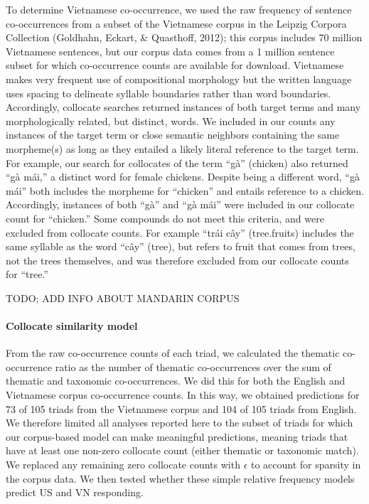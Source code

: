 \documentclass[10pt, letterpaper]{article}
\begin{document}
To determine Vietnamese co-occurrence, we used the raw frequency of
sentence co-occurrences from a subset of the Vietnamese corpus in the
Leipzig Corpora Collection (Goldhahn, Eckart, \& Quasthoff, 2012); this
corpus includes 70 million Vietnamese sentences, but our corpus data
comes from a 1 million sentence subset for which co-occurrence counts
are available for download. Vietnamese makes very frequent use of
compositional morphology but the written language uses spacing to
delineate syllable boundaries rather than word boundaries. Accordingly,
collocate searches returned instances of both target terms and many
morphologically related, but distinct, words. We included in our counts
any instances of the target term or close semantic neighbors containing
the same morpheme(s) as long as they entailed a likely literal reference
to the target term. For example, our search for collocates of the term
``gà'' (chicken) also returned ``gà mái,'' a distinct word for female
chickens. Despite being a different word, ``gà mái'' both includes the
morpheme for ``chicken'' and entails reference to a chicken.
Accordingly, instances of both ``gà'' and ``gà mái'' were included in
our collocate count for ``chicken.'' Some compounds do not meet this
criteria, and were excluded from collocate counts. For example ``trái
cây'' (tree.fruits) includes the same syllable as the word ``cây''
(tree), but refers to fruit that comes from trees, not the trees
themselves, and was therefore excluded from our collocate counts for
``tree.''

TODO; ADD INFO ABOUT MANDARIN CORPUS

\hypertarget{collocate-similarity-model}{%
\paragraph{Collocate similarity
model}\label{collocate-similarity-model}}

From the raw co-occurrence counts of each triad, we calculated the
thematic co-occurrence ratio as the number of thematic co-occurrences
over the sum of thematic and taxonomic co-occurrences. We did this for
both the English and Vietnamese corpus co-occurrence counts. In this
way, we obtained predictions for 73 of 105 triads from the Vietnamese
corpus and 104 of 105 triads from English. We therefore limited all
analyses reported here to the subset of triads for which our
corpus-based model can make meaningful predictions, meaning triads that
have at least one non-zero collocate count (either thematic or taxonomic
match). We replaced any remaining zero collocate counts with
\(\epsilon\) to account for sparsity in the corpus data. We then tested
whether these simple relative frequency models predict US and VN
responding.
\end{document}
